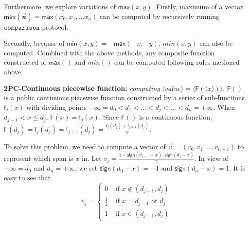 \documentclass[letterpaper]{article} %
\begin{document}
    Furthermore, we explore variations of $\mathsf{max}(x,y)$.
    Firstly, maximum of a vector $\mathsf{max}(\overrightarrow{\mathbf{x}})=\mathsf{max}(x_{0},x_{1},...x_{n})$
    can be computed by recursively running $\mathtt{comparison}$ protocol.

    Secondly, because of $\mathsf{min}(x,y)=-\mathsf{max}(-x,-y)$,  $min(x,y)$ can also be computed.
    Combined with the above methods,
    any composite function constructed of $\mathsf{max}()$ and $min()$ can be computed following rules metioned above.

    \textbf{2PC-Continuous piecewise function:}
    \emph{computing}
    $\langle value\rangle  = \langle \mathsf{F}(\langle x\rangle)\rangle $.
    $\mathsf{F}()$ is a public continuous piecewise function constructed by a series of sub-functions $\mathsf{f}_{j}(x)$
    with dividing points $-\infty =d_{0}<d_{1}<...<d_{j}<...<d_{n}=+\infty$.
    When $d_{j-1}< x\leq d_{j}$, $\mathsf{F}(x) =\mathsf{f}_{j}(x)$.
    Since $\mathsf{F}()$ is a continuous function, $\mathsf{F}(d_{j}) =\mathsf{f}_{j}(d_{j})=\mathsf{f}_{j+1}(d_{j})=\frac{\mathsf{f}_{j}(d_{j})+\mathsf{f}_{j+1}(d_{j})}{2}$.


    To solve this problem, we need to compute a vector of
    $\overrightarrow{v}=(v_{0},v_{1},...,v_{n-1})$ to represent which span is $x$ in.
    Let $v_{j} = \frac{1-\mathsf{sign}(d_{j-1}-x)\cdot \mathsf{sign}(d_{j}-x)}{2}$.
    In view of $-\infty =d_{0}$ and $d_{n}=+\infty$,
    we set $\mathsf{sign}(d_{0}-x)=-1$ and $\mathsf{sign}(d_{n}-x)=1$.
    It is easy to see that
    $$v_{j}=\begin{cases}
        0 & \text{ if } x\notin (d_{j-1},d_{j}) \\
        \frac{1}{2} & \text{ if } x = d_{j-1} \text{ or } d_{j}\\
        1 & \text{ if } x\in (d_{j-1},d_{j})
        \end{cases}$$
\end{document}
